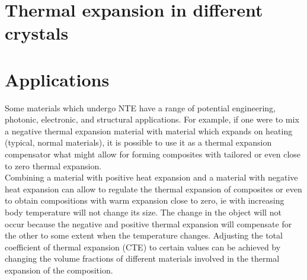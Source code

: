 \documentclass[10pt, a4paper, twocolumn]{article}
\begin{document}



\section{Thermal expansion in different crystals}


\section{Applications}
Some materials which undergo NTE have a range of potential engineering, photonic, electronic, and structural applications. For example, if one were to mix a negative thermal expansion material with  material which expands on heating (typical, normal materials), it is possible to use it as a thermal expansion compensator what might allow for forming composites with tailored or even close to zero thermal expansion. \\ 

Combining a material with positive heat expansion and a material with negative heat expansion can allow to regulate the thermal expansion of composites or even to obtain compositions with warm expansion close to zero, ie with increasing body temperature will not change its size. The change in the object will not occur because the negative and positive thermal expansion will compensate for the other to some extent when the temperature changes. Adjusting the total coefficient of thermal expansion (CTE) to certain values  can be achieved by changing the volume fractions of different materials involved in the thermal expansion of the composition.\\ 
\end{document}
